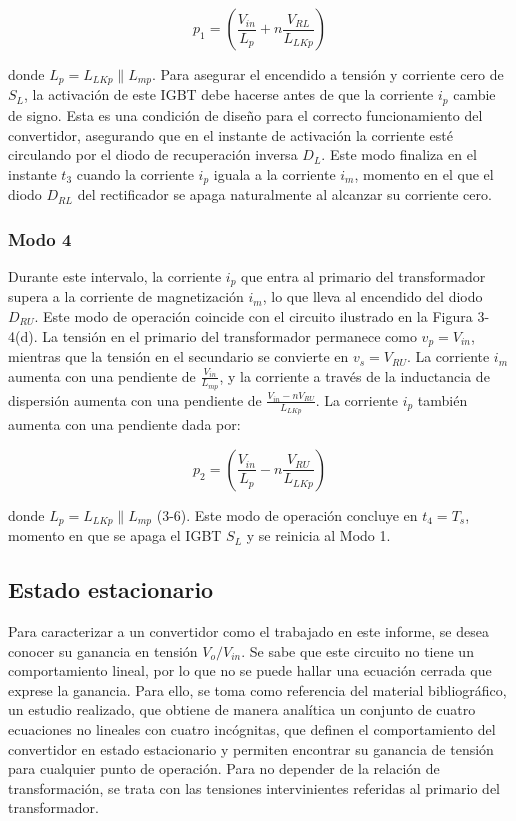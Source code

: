 \[
p_1 = \left( \frac{V_{in}}{L_p} + n \frac{V_{RL}}{L_{LKp}} \right)
\]

donde \( L_p = L_{LKp} \parallel L_{mp} \). Para asegurar el encendido a tensión y corriente cero de \( S_L \), la activación de este IGBT debe hacerse antes de que la corriente \( i_p \) cambie de signo. Esta es una condición de diseño para el correcto funcionamiento del convertidor, asegurando que en el instante de activación la corriente esté circulando por el diodo de recuperación inversa \( D_L \). Este modo finaliza en el instante \( t_3 \) cuando la corriente \( i_p \) iguala a la corriente \( i_m \), momento en el que el diodo \( D_{RL} \) del rectificador se apaga naturalmente al alcanzar su corriente cero.

\subsubsection{Modo 4}

Durante este intervalo, la corriente \( i_p \) que entra al primario del transformador supera a la corriente de magnetización \( i_m \), lo que lleva al encendido del diodo \( D_{RU} \). Este modo de operación coincide con el circuito ilustrado en la Figura 3-4(d). La tensión en el primario del transformador permanece como \( v_p = V_{in} \), mientras que la tensión en el secundario se convierte en \( v_s = V_{RU} \). La corriente \( i_m \) aumenta con una pendiente de \( \frac{V_{in}}{L_{mp}} \), y la corriente a través de la inductancia de dispersión aumenta con una pendiente de \( \frac{V_{in} - nV_{RU}}{L_{LKp}} \). La corriente \( i_p \) también aumenta con una pendiente dada por:

\[
p_2 = \left( \frac{V_{in}}{L_p} - n \frac{V_{RU}}{L_{LKp}} \right)
\]

donde \( L_p = L_{LKp} \parallel L_{mp} \) (3-6). Este modo de operación concluye en \( t_4 = T_s \), momento en que se apaga el IGBT \( S_L \) y se reinicia al Modo 1.

\subsection{Estado estacionario}

Para caracterizar a un convertidor como el trabajado en este informe, se desea conocer su ganancia en tensión $V_o/V_{in}$. Se sabe que este circuito no tiene un comportamiento lineal, por lo que no se puede hallar una ecuación cerrada que exprese la ganancia. Para ello, se toma como referencia del material bibliográfico, un estudio realizado, que obtiene de manera analítica un conjunto de cuatro ecuaciones no lineales con cuatro incógnitas, que definen el comportamiento del convertidor en estado estacionario y permiten encontrar su ganancia de tensión para cualquier punto de operación. Para no depender de la relación de transformación, se trata con las tensiones intervinientes referidas al primario del transformador. 

